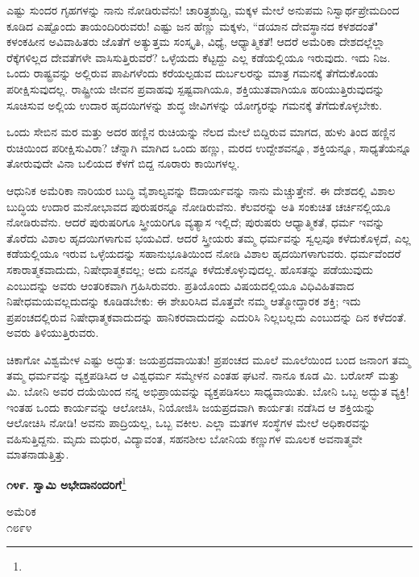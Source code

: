 ಎಷ್ಟು ಸುಂದರ ಗೃಹಗಳನ್ನು ನಾನು ನೋಡಿರುವೆನು! ಚಾರಿತ್ರ್ಯಶುದ್ದಿ, ಮಕ್ಕಳ ಮೇಲೆ ಅನುಪಮ ನಿಸ್ವಾರ್ಥಪ್ರೇಮದಿಂದ ಕೂಡಿದ ಎಷ್ಟೊಂದು ತಾಯಂದಿರಿರುವರು! ಎಷ್ಟು ಜನ ಹೆಣ್ಣು ಮಕ್ಕಳು, ``ಡಯಾನ ದೇವಸ್ಥಾನದ ಕಳಶದಂತೆ" ಕಳಂಕಹೀನ ಅವಿವಾಹಿತರು\enginline{-} ಜೊತೆಗೆ ಅತ್ಯುತ್ತಮ ಸಂಸ್ಕೃತಿ, ವಿಧ್ಯೆ, ಆಧ್ಯಾತ್ಮಿಕತೆ! ಆದರೆ ಅಮೆರಿಕಾ ದೇಶದಲ್ಲೆಲ್ಲಾ ರೆಕ್ಕೆಗಳಿಲ್ಲದ ದೇವತೆಗಳೇ ವಾಸಿಸುತ್ತಿರುವರೆ? ಒಳ್ಳೆಯದು ಕೆಟ್ಟದ್ದು ಎಲ್ಲ ಕಡೆಯಲ್ಲಿಯೂ ಇರುವುದು. ಇದು ನಿಜ. ಒಂದು ರಾಷ್ಟ್ರವನ್ನು ಅಲ್ಲಿರುವ ಪಾಪಿಗಳೆಂದು ಕರೆಯಲ್ಪಡುವ ದುರ್ಬಲರನ್ನು ಮಾತ್ರ ಗಮನಕ್ಕೆ ತೆಗೆದುಕೊಂಡು ಪರೀಕ್ಷಿಸುವುದಲ್ಲ. ರಾಷ್ಟ್ರೀಯ ಜೀವನ ಪ್ರವಾಹವು ಸ್ಪಷ್ಟವಾಗಿಯೂ, ಶಕ್ತಿಯುತವಾಗಿಯೂ ಹರಿಯುತ್ತಿರುವುದನ್ನು ಸೂಚಿಸುವ ಅಲ್ಲಿಯ ಉದಾರ ಹೃದಯಿಗಳನ್ನು ಶುದ್ಧ ಜೀವಿಗಳನ್ನು ಯೋಗ್ಯರನ್ನು ಗಮನಕ್ಕೆ ತೆಗೆದುಕೊಳ್ಳಬೇಕು.

ಒಂದು ಸೇಬಿನ ಮರ ಮತ್ತು ಅದರ ಹಣ್ಣಿನ ರುಚಿಯನ್ನು ನೆಲದ ಮೇಲೆ ಬಿದ್ದಿರುವ ಮಾಗದ, ಹುಳು ತಿಂದ ಹಣ್ಣಿನ ರುಚಿಯಿಂದ ಪರೀಕ್ಷಿಸುವಿರಾ? ಚೆನ್ನಾಗಿ ಮಾಗಿದ ಒಂದು ಹಣ್ಣು, ಮರದ ಉದ್ದೇಶವನ್ನೂ, ಶಕ್ತಿಯನ್ನೂ, ಸಾಧ್ಯತೆಯನ್ನೂ ತೋರುವುದೇ ವಿನಾ ಬಲಿಯದ ಕೆಳಗೆ ಬಿದ್ದ ನೂರಾರು ಕಾಯಿಗಳಲ್ಲ.

ಆಧುನಿಕ ಅಮೆರಿಕಾ ನಾರಿಯರ ಬುದ್ಧಿ ವೈಶಾಲ್ಯವನ್ನು ಔದಾರ್ಯವನ್ನು ನಾನು ಮೆಚ್ಚುತ್ತೇನೆ. ಈ ದೇಶದಲ್ಲಿ ವಿಶಾಲ ಬುದ್ಧಿಯ ಉದಾರ ಮನೋಭಾವದ ಪುರುಷರನ್ನೂ ನೋಡಿರುವೆನು. ಕೆಲವರನ್ನು ಅತಿ ಸಂಕುಚಿತ ಚರ್ಚಿನಲ್ಲಿಯೂ ನೋಡಿರುವೆನು. ಆದರೆ ಪುರುಷರಿಗೂ ಸ್ತ್ರೀಯರಿಗೂ ವ್ಯತ್ಯಾಸ ಇಲ್ಲಿದೆ; ಪುರುಷರು ಆಧ್ಯಾತ್ಮಿಕತೆ, ಧರ್ಮ ಇವನ್ನು ತೊರೆದು ವಿಶಾಲ ಹೃದಯಿಗಳಾಗುವ ಭಯವಿದೆ. ಆದರೆ ಸ್ತ್ರೀಯರು ತಮ್ಮ ಧರ್ಮವನ್ನು ಸ್ವಲ್ಪವೂ ಕಳೆದುಕೊಳ್ಳದೆ, ಎಲ್ಲ ಕಡೆಯಲ್ಲಿಯೂ ಇರುವ ಒಳ್ಳೆಯದನ್ನು ಸಹಾನುಭೂತಿಯಿಂದ ನೋಡಿ ವಿಶಾಲ ಹೃದಯಿಗಳಾಗುವರು. ಧರ್ಮವೆಂದರೆ ಸಕಾರಾತ್ಮಕವಾದುದು, ನಿಷೇಧಾತ್ಮಕವಲ್ಲ; ಅದು ಏನನ್ನೂ ಕಳೆದುಕೊಳ್ಳುವುದಲ್ಲ. ಹೊಸತನ್ನು ಪಡೆಯುವುದು ಎಂಬುದನ್ನು ಅವರು ಆಂತರಿಕವಾಗಿ ಗ್ರಹಿಸಿರುವರು. ಪ್ರತಿಯೊಂದು ವಿಷಯದಲ್ಲಿಯೂ ವಿಧಿವಿಹಿತವಾದ ನಿಷೇಧಮಯವಲ್ಲದುದನ್ನು ಕೂಡಿಡಬೇಕು: ಈ ಶೇಖರಿಸಿದ ಮೊತ್ತವೇ ನಮ್ಮ ಆತ್ಮೋದ್ಧಾರಕ ಶಕ್ತಿ; ಇದು ಪ್ರಪಂಚದಲ್ಲಿರುವ ನಿಷೇಧಾತ್ಮಕವಾದುದನ್ನು ಹಾನಿಕರವಾದುದನ್ನು ಎದುರಿಸಿ ನಿಲ್ಲಬಲ್ಲದು ಎಂಬುದನ್ನು ದಿನ ಕಳೆದಂತೆ. ಅವರು ತಿಳಿಯುತ್ತಿರುವರು.

ಚಿಕಾಗೋ ವಿಶ್ವಮೇಳ ಎಷ್ಟು ಅದ್ಭುತ: ಜಯಪ್ರದವಾಯಿತು! ಪ್ರಪಂಚದ ಮೂಲೆ ಮೂಲೆಯಿಂದ ಬಂದ ಜನಾಂಗ ತಮ್ಮ ತಮ್ಮ ಧರ್ಮವನ್ನು ವ್ಯಕ್ತಪಡಿಸಿದ ಆ ವಿಶ್ವಧರ್ಮ ಸಮ್ಮೇಳನ ಎಂತಹ ಘಟನೆ. ನಾನೂ ಕೂಡ ಮಿ. ಬರೋಸ್ ಮತ್ತು ಮಿ. ಬೋನಿ ಅವರ ದಯೆಯಿಂದ ನನ್ನ ಅಭಿಪ್ರಾಯವನ್ನು ವ್ಯಕ್ತಪಡಿಸಲು ಸಾಧ್ಯವಾಯಿತು. ಬೋನಿ ಒಬ್ಬ ಅದ್ಭುತ ವ್ಯಕ್ತಿ! ಇಂತಹ ಒಂದು ಕಾರ್ಯವನ್ನು ಆಲೋಚಿಸಿ, ನಿಯೋಜಿಸಿ ಜಯಪ್ರದವಾಗಿ ಕಾರ್ಯತಃ ನಡೆಸಿದ ಆ ಶಕ್ತಿಯನ್ನು ಆಲೋಚಿಸಿ ನೋಡಿ! ಅವನು ಪಾದ್ರಿಯಲ್ಲ, ಒಬ್ಬ ವಕೀಲ. ಎಲ್ಲಾ ಮತಗಳ ಸಂಸ್ಥೆಗಳ ಮೇಲೆ ಅಧಿಕಾರವನ್ನು ವಹಿಸುತ್ತಿದ್ದನು. ಮೃದು ಮಧುರ, ವಿದ್ಯಾವಂತ, ಸಹನಶೀಲ ಬೋನಿಯ ಕಣ್ಣುಗಳ ಮೂಲಕ ಅವನಾತ್ಮವೇ ಮಾತನಾಡುತ್ತಿತ್ತು.

\begin{center}
\textbf{೧೪೯. ಸ್ವಾಮಿ ಅಭೇದಾನಂದರಿಗೆ}\footnote{}
\end{center}

\begin{flushright}
ಅಮೆರಿಕ\\೧೮೯೪
\end{flushright}

